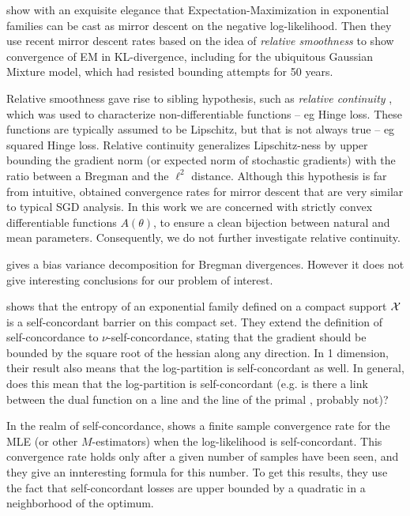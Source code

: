 \documentclass{article}
\newcommand{\logpart}{A}
\newcommand{\natp}{\theta}
\begin{document}
\citet{kunstner2020homeomorphic} show with an exquisite elegance that Expectation-Maximization in exponential families can be cast as mirror descent on the negative log-likelihood. Then they use recent mirror descent rates based on the idea of \textit{relative smoothness} \citep{birnbaum2011distributed, bauschke2017descent, lu2018relatively} to show convergence of EM in KL-divergence, including for the ubiquitous Gaussian Mixture model, which had resisted bounding attempts for 50 years.

Relative smoothness gave rise to sibling hypothesis, such as \textit{relative continuity} \citep{lu2019relative},  which was used to characterize non-differentiable functions -- eg Hinge loss. These functions are typically assumed to be Lipschitz, but that is not always true -- eg squared Hinge loss. Relative continuity generalizes Lipschitz-ness by upper bounding the gradient norm (or expected norm of stochastic gradients) with the ratio between a Bregman and the $\ell^2$ distance. Although this hypothesis is far from intuitive, \citet{lu2019relative} obtained convergence rates for mirror descent that are very similar to typical SGD analysis. In this work we are concerned with strictly convex differentiable functions $\logpart(\natp)$, to ensure a clean bijection between natural and mean parameters. Consequently, we do not further investigate relative continuity.

\citet{pfau2013generalized} gives a bias variance decomposition for Bregman divergences. However it does not give interesting conclusions for our problem of interest.


\citet{bubeck2015entropic} shows that the entropy of an exponential family defined on a compact support ${\mathcal X}$ is a self-concordant barrier on this compact set. They extend the definition of self-concordance to $\nu$-self-concordance, stating that the gradient should be bounded by the square root of the hessian along any direction. In 1 dimension, their result also means that the log-partition is self-concordant as well. In general, does this mean that the log-partition is self-concordant  (e.g. is there a link between the dual function on a line and the line of the primal , probably not)?


In the realm of self-concordance, \citet{ostrovskii2021finite}  shows a finite sample convergence rate for the MLE (or other $M$-estimators)   when  the log-likelihood is self-concordant. This convergence rate holds only after a given number of samples have been seen, and they give an innteresting formula for this number. To get this results, they use the fact that self-concordant losses are upper bounded by a quadratic in a neighborhood of the optimum. 
\end{document}

